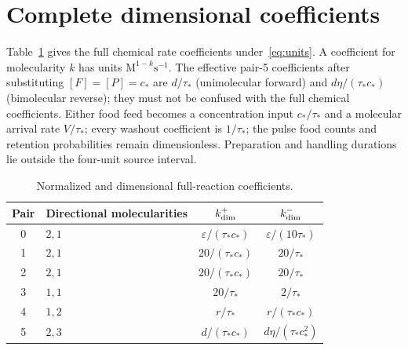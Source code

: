 \documentclass[11pt,a4paper]{article}
\theoremstyle{plain}
\theoremstyle{definition}
\theoremstyle{remark}
\newcommand{\eps}{\varepsilon}
\begin{document}
\section{Complete dimensional coefficients}\label{app:coefficients}
Table~\ref{tab:coefficients} gives the full chemical rate coefficients under~\eqref{eq:units}. A coefficient for molecularity $k$ has units $\mathrm M^{1-k}\mathrm s^{-1}$. The effective pair-5 coefficients after substituting $[F]=[P]=c_*$ are $d/\tau_*$ (unimolecular forward) and $d\eta/(\tau_*c_*)$ (bimolecular reverse); they must not be confused with the full chemical coefficients. Either food feed becomes a concentration input $c_*/\tau_*$ and a molecular arrival rate $V/\tau_*$; every washout coefficient is $1/\tau_*$; the pulse food counts and retention probabilities remain dimensionless. Preparation and handling durations lie outside the four-unit source interval.

\begin{table}[tb]
\centering\small
\begin{tabular}{clcc}
\toprule
Pair & Directional molecularities & $k^+_{\rm dim}$ & $k^-_{\rm dim}$\\
\midrule
0 & $2,1$ & $\eps/(\tau_*c_*)$ & $\eps/(10\tau_*)$\\
1 & $2,1$ & $20/(\tau_*c_*)$ & $20/\tau_*$\\
2 & $2,1$ & $20/(\tau_*c_*)$ & $20/\tau_*$\\
3 & $1,1$ & $20/\tau_*$ & $2/\tau_*$\\
4 & $1,2$ & $r/\tau_*$ & $r/(\tau_*c_*)$\\
5 & $2,3$ & $d/(\tau_*c_*)$ & $d\eta/(\tau_*c_*^2)$\\
\bottomrule
\end{tabular}
\caption{Normalized and dimensional full-reaction coefficients.}
\label{tab:coefficients}
\end{table}
\end{document}
